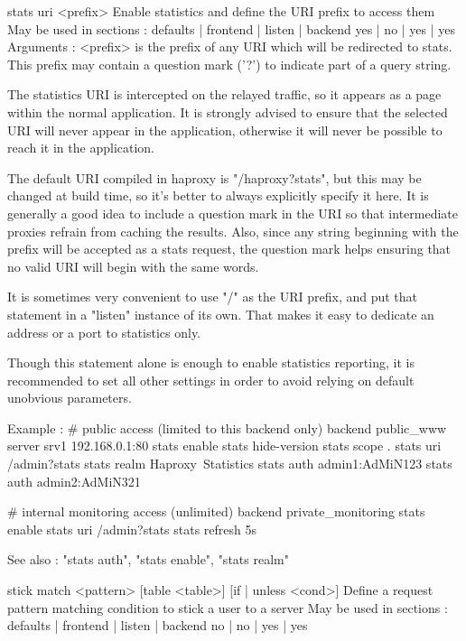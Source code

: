 stats uri <prefix>
  Enable statistics and define the URI prefix to access them
  May be used in sections :   defaults | frontend | listen | backend
                                 yes   |    no    |   yes  |   yes
  Arguments :
    <prefix>  is the prefix of any URI which will be redirected to stats. This
              prefix may contain a question mark ('?') to indicate part of a
              query string.

  The statistics URI is intercepted on the relayed traffic, so it appears as a
  page within the normal application. It is strongly advised to ensure that the
  selected URI will never appear in the application, otherwise it will never be
  possible to reach it in the application.

  The default URI compiled in haproxy is "/haproxy?stats", but this may be
  changed at build time, so it's better to always explicitly specify it here.
  It is generally a good idea to include a question mark in the URI so that
  intermediate proxies refrain from caching the results. Also, since any string
  beginning with the prefix will be accepted as a stats request, the question
  mark helps ensuring that no valid URI will begin with the same words.

  It is sometimes very convenient to use "/" as the URI prefix, and put that
  statement in a "listen" instance of its own. That makes it easy to dedicate
  an address or a port to statistics only.

  Though this statement alone is enough to enable statistics reporting, it is
  recommended to set all other settings in order to avoid relying on default
  unobvious parameters.

  Example :
    # public access (limited to this backend only)
    backend public_www
        server srv1 192.168.0.1:80
        stats enable
        stats hide-version
        stats scope   .
        stats uri     /admin?stats
        stats realm   Haproxy\ Statistics
        stats auth    admin1:AdMiN123
        stats auth    admin2:AdMiN321

    # internal monitoring access (unlimited)
    backend private_monitoring
        stats enable
        stats uri     /admin?stats
        stats refresh 5s

  See also : "stats auth", "stats enable", "stats realm"


stick match <pattern> [table <table>] [{if | unless} <cond>]
  Define a request pattern matching condition to stick a user to a server
  May be used in sections :   defaults | frontend | listen | backend
                                 no    |    no    |   yes  |   yes

